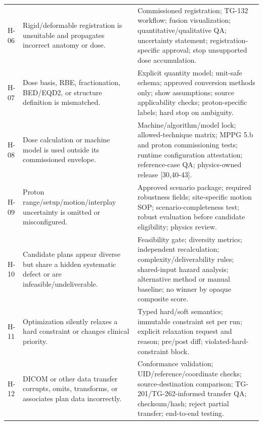\documentclass[11pt,letterpaper]{article}
\begin{document}
\begin{small}
\begin{longtable}{@{}L{0.0639\textwidth}L{0.3244\textwidth}L{0.5318\textwidth}@{}}
\addlinespace[2pt]
H-06 & Rigid\slash\allowbreak{}deformable registration is unsuitable and propagates incorrect anatomy or dose. & Commissioned registration; TG-132 workflow; fusion visualization; quantitative\slash\allowbreak{}qualitative QA; uncertainty statement; registration-specific approval; stop unsupported dose accumulation. \\
\addlinespace[2pt]
H-07 & Dose basis, RBE, fractionation, BED\slash\allowbreak{}EQD2, or structure definition is mismatched. & Explicit quantity model; unit-safe schema; approved conversion methods only; show assumptions; source applicability checks; proton-specific labels; hard stop on ambiguity. \\
\addlinespace[2pt]
H-08 & Dose calculation or machine model is used outside its commissioned envelope. & Machine\slash\allowbreak{}algorithm\slash\allowbreak{}model lock; allowed-technique matrix; MPPG 5.b and proton commissioning tests; runtime configuration attestation; reference-case QA; physics-owned release [30,40-43]. \\
\addlinespace[2pt]
H-09 & Proton range\slash\allowbreak{}setup\slash\allowbreak{}motion\slash\allowbreak{}interplay uncertainty is omitted or misconfigured. & Approved scenario package; required robustness fields; site-specific motion SOP; scenario-completeness test; robust evaluation before candidate eligibility; physics review. \\
\addlinespace[2pt]
H-10 & Candidate plans appear diverse but share a hidden systematic defect or are infeasible\slash\allowbreak{}undeliverable. & Feasibility gate; diversity metrics; independent recalculation; complexity\slash\allowbreak{}deliverability rules; shared-input hazard analysis; alternative method or manual baseline; no winner by opaque composite score. \\
\addlinespace[2pt]
H-11 & Optimization silently relaxes a hard constraint or changes clinical priority. & Typed hard\slash\allowbreak{}soft semantics; immutable constraint set per run; explicit relaxation request and reason; pre\slash\allowbreak{}post diff; violated-hard-constraint block. \\
\addlinespace[2pt]
H-12 & DICOM or other data transfer corrupts, omits, transforms, or associates plan data incorrectly. & Conformance validation; UID\slash\allowbreak{}reference\slash\allowbreak{}coordinate checks; source-destination comparison; TG-201\slash\allowbreak{}TG-262-informed transfer QA; checksum\slash\allowbreak{}hash; reject partial transfer; end-to-end testing. \\

\end{longtable}
\end{small}
\end{document}
